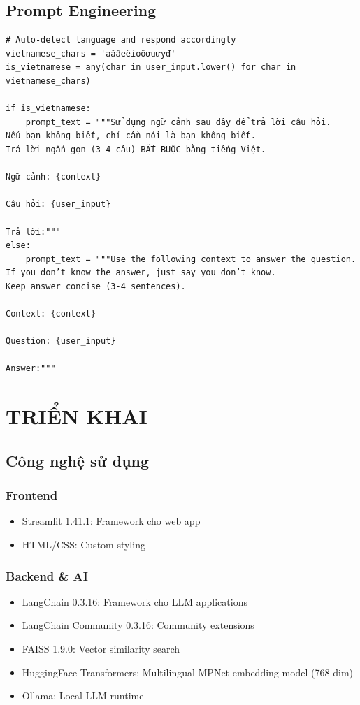 \documentclass[12pt,a4paper]{report}
\begin{document}
\section{Prompt Engineering}
\begin{lstlisting}
# Auto-detect language and respond accordingly
vietnamese_chars = 'aăâeêioôơuưyđ'
is_vietnamese = any(char in user_input.lower() for char in vietnamese_chars)

if is_vietnamese:
    prompt_text = """Sử dụng ngữ cảnh sau đây để trả lời câu hỏi.
Nếu bạn không biết, chỉ cần nói là bạn không biết.
Trả lời ngắn gọn (3-4 câu) BẮT BUỘC bằng tiếng Việt.

Ngữ cảnh: {context}

Câu hỏi: {user_input}

Trả lời:"""
else:
    prompt_text = """Use the following context to answer the question.
If you don’t know the answer, just say you don’t know.
Keep answer concise (3-4 sentences).

Context: {context}

Question: {user_input}

Answer:"""
\end{lstlisting}

\newpage

\chapter{TRIỂN KHAI}

\section{Công nghệ sử dụng}

\subsection{Frontend}
\begin{itemize}
    \item Streamlit 1.41.1: Framework cho web app
    \item HTML/CSS: Custom styling
\end{itemize}

\subsection{Backend \& AI}
\begin{itemize}
    \item LangChain 0.3.16: Framework cho LLM applications
    \item LangChain Community 0.3.16: Community extensions
    \item FAISS 1.9.0: Vector similarity search
    \item HuggingFace Transformers: Multilingual MPNet embedding model (768-dim)
    \item Ollama: Local LLM runtime
\end{itemize}
\end{document}
